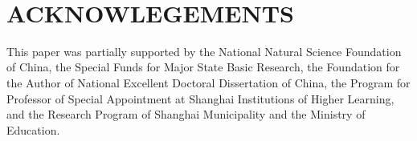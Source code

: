 \documentclass[%
 reprint,
 amsmath,amssymb,
 aps,
prb,
]{revtex4-1}
\begin{document}
\quad \\
\section{ACKNOWLEGEMENTS}
This paper was partially supported by the National Natural Science Foundation of China, the Special Funds for Major State Basic Research, the Foundation for the Author of National Excellent Doctoral Dissertation of China, the Program for Professor of Special Appointment at Shanghai Institutions of Higher Learning, and the Research Program of Shanghai Municipality and the Ministry of Education.



\end{document}
